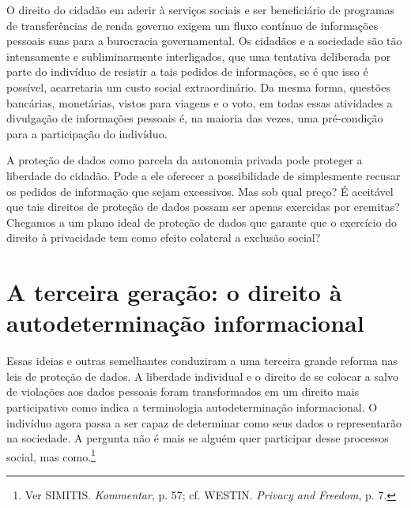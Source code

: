 O direito do cidadão em aderir à serviços sociais e ser beneficiário de
programas de transferências de renda governo exigem um fluxo contínuo de
informações pessoais suas para a burocracia governamental. Os cidadãos e
a sociedade são tão intensamente e subliminarmente interligados, que uma
tentativa deliberada por parte do indivíduo de resistir a tais pedidos
de informações, se é que isso é possível, acarretaria um custo social
extraordinário. Da mesma forma, questões bancárias, monetárias, vistos
para viagens e o voto, em todas essas atividades a divulgação de
informações pessoais é, na maioria das vezes, uma pré-condição para a
participação do indivíduo.

A proteção de dados como parcela da autonomia privada pode proteger a
liberdade do cidadão. Pode a ele oferecer a possibilidade de
simplesmente recusar os pedidos de informação que sejam excessivos. Mas
sob qual preço? É aceitável que tais direitos de proteção de dados
possam ser apenas exercidas por eremitas? Chegamos a um plano ideal de
proteção de dados que garante que o exercício do direito à privacidade
tem como efeito colateral a exclusão social?

\section{A terceira geração: o direito à autodeterminação informacional}

Essas ideias e outras semelhantes conduziram a uma terceira grande
reforma nas leis de proteção de dados. A liberdade individual e o
direito de se colocar a salvo de violações aos dados pessoais foram
transformados em um direito mais participativo como indica a
terminologia autodeterminação informacional. O indivíduo agora passa a
ser capaz de determinar como seus dados o representarão na sociedade. A
pergunta não é mais se alguém quer participar desse processos social,
mas como.\footnote{Ver SIMITIS. \emph{Kommentar}, p. 57; cf. WESTIN.
  \emph{Privacy and Freedom}, p. 7.}

